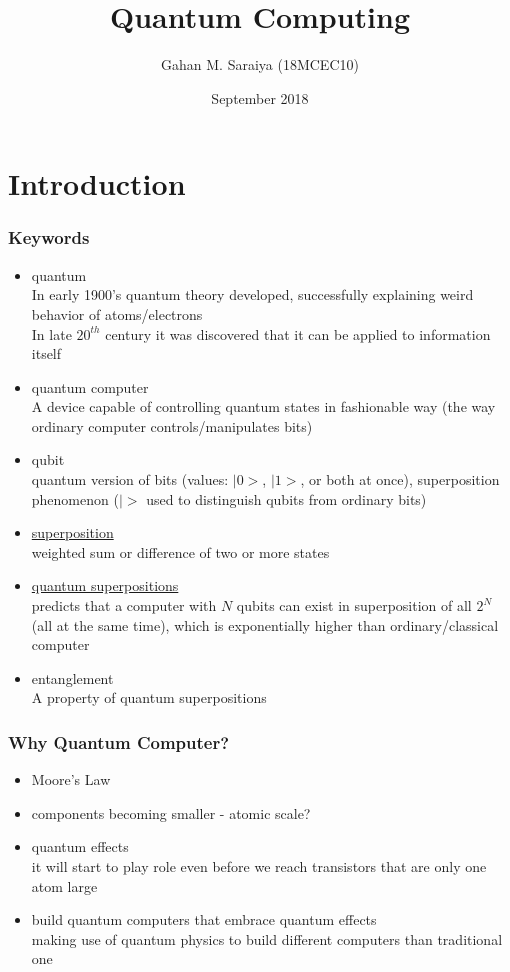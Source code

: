\documentclass{beamer}
\title{Quantum Computing}
\author{Gahan M. Saraiya (18MCEC10)}
\institute{M.Tech (Computer Science and Engineering) 
	\\ Institute of Technology, Nirma University, Ahmedabad}
\date{{\scriptsize September 2018}}
\begin{document}
\begin{frame}
\titlepage
\end{frame}


\section{Introduction}

	\begin{frame}[allowframebreaks]
	\frametitle{Keywords}
		\begin{itemize}
			\item quantum
				{\scriptsize \\ In early 1900's quantum theory developed, successfully explaining weird behavior of atoms/electrons
				\\ In late $20^{th}$ century it was discovered that it can be applied to information itself}
			\item quantum computer
				{\scriptsize \\ A device capable of controlling quantum states in fashionable way (the way ordinary computer controls/manipulates bits)}
			\item qubit
				{\scriptsize \\ quantum version of bits (values: $|0>$, $|1>$, or both at once), superposition phenomenon
				($|>$ used to distinguish qubits from ordinary bits)}
			\item \href{https://en.wikipedia.org/wiki/Superposition_principle}{superposition}
				{\scriptsize \\ weighted sum or difference of two or more states}
			\item \href{https://en.wikipedia.org/wiki/Quantum_superposition}{quantum superpositions}
				{\scriptsize \\ predicts that a computer with $N$ qubits can exist in superposition of all $2^N$ (all at the same time), which is exponentially higher than ordinary/classical computer}
			\item {entanglement}
				{\scriptsize \\ A property of quantum superpositions}
		\end{itemize}
	\end{frame}
	
	
	\begin{frame}
	\frametitle{Why Quantum Computer?}
	
	\begin{itemize}
		\item Moore's Law
		\item components becoming smaller - atomic scale?
		\item quantum effects
			\\ {\scriptsize 
				it will start to play role even before we reach transistors that are only one atom large
			}
		\item build quantum computers that embrace quantum effects
			\\ {\scriptsize 
				making use of quantum physics to build different computers than traditional one
			}
	\end{itemize}
	\end{frame}
\end{document}
